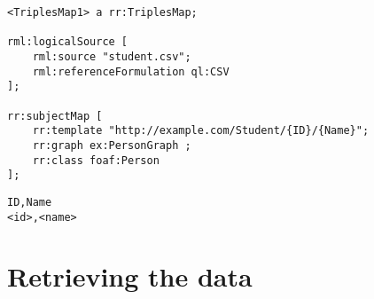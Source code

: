 \begin{lstlisting}[caption={Example mapping for a CSV file}, label={lst:csv_file_mapping}, captionpos=b, basicstyle=\small]
<TriplesMap1> a rr:TriplesMap;

rml:logicalSource [ 
    rml:source "student.csv";
    rml:referenceFormulation ql:CSV
];

rr:subjectMap [ 
    rr:template "http://example.com/Student/{ID}/{Name}";
    rr:graph ex:PersonGraph ;
    rr:class foaf:Person
];
\end{lstlisting}

\begin{lstlisting}[caption={Example CSV template}, label={lst:csv_file}, captionpos=b, basicstyle=\small]
ID,Name
<id>,<name>
\end{lstlisting}

\section{Retrieving the data}
